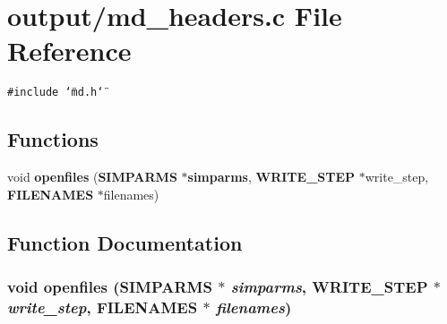\section{output/md\_\-headers.c File Reference}
\label{md__headers_8c}
{\tt \#include \char`\"{}md.h\char`\"{}}\par
\subsection*{Functions}
\begin{CompactItemize}
\item 
void {\bf openfiles} ({\bf SIMPARMS} $\ast${\bf simparms}, {\bf WRITE\_\-STEP} $\ast$write\_\-step, {\bf FILENAMES} $\ast$filenames)
\end{CompactItemize}


\subsection{Function Documentation}
\subsubsection{\setlength{\rightskip}{0pt plus 5cm}void openfiles ({\bf SIMPARMS} $\ast$ {\em simparms}, {\bf WRITE\_\-STEP} $\ast$ {\em write\_\-step}, {\bf FILENAMES} $\ast$ {\em filenames})}\label{md__headers_8c_5cb854132045e3023b23fab06aded8c3}


